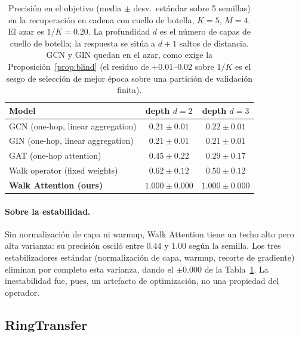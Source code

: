 \begin{table}[t]
\centering
\caption{Precisión en el objetivo (media $\pm$ desv.\ estándar sobre 5 semillas) en la recuperación
en cadena con cuello de botella, $K{=}5$, $M{=}4$. El azar es $1/K=0.20$. La profundidad $d$ es el número de
capas de cuello de botella; la respuesta se sitúa a $d{+}1$ saltos de distancia.
GCN y GIN quedan en el azar, como exige la Proposición~\ref{prop:blind} (el
residuo de $+0.01$--$0.02$ sobre $1/K$ es el sesgo de selección de mejor época
sobre una partición de validación finita).}
\label{tab:main}
\begin{tabular}{lcc}
\toprule
\textbf{Model} & \textbf{depth $d=2$} & \textbf{depth $d=3$} \\
\midrule
GCN (one-hop, linear aggregation)  & $0.21\pm0.01$ & $0.22\pm0.01$ \\
GIN (one-hop, linear aggregation)  & $0.21\pm0.01$ & $0.21\pm0.01$ \\
GAT (one-hop attention)            & $0.45\pm0.22$ & $0.29\pm0.17$ \\
Walk operator (fixed weights)      & $0.62\pm0.12$ & $0.50\pm0.12$ \\
\textbf{Walk Attention (ours)}     & $\mathbf{1.000\pm0.000}$ & $\mathbf{1.000\pm0.000}$ \\
\bottomrule
\end{tabular}
\end{table}

\paragraph{Sobre la estabilidad.}
Sin normalización de capa ni warmup, Walk Attention tiene un techo alto pero
alta varianza: su precisión osciló entre $0.44$ y $1.00$ según la semilla. Los tres
estabilizadores estándar (normalización de capa, warmup, recorte de gradiente)
eliminan por completo esta varianza, dando el $\pm0.000$ de la
Tabla~\ref{tab:main}. La inestabilidad fue, pues, un artefacto de optimización, no
una propiedad del operador.

\subsection{RingTransfer}

